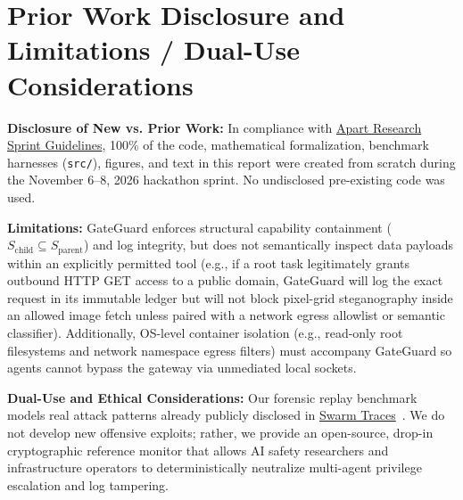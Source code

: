 \documentclass[10pt,twocolumn,a4paper]{article}
\begin{document}
\appendix
\section*{Prior Work Disclosure and Limitations / Dual-Use Considerations}

\textbf{Disclosure of New vs. Prior Work:} In compliance with \href{https://apartresearch.com/sprints/swarm-alignment-2026#guidelines}{Apart Research Sprint Guidelines}, 100\% of the code, mathematical formalization, benchmark harnesses (\texttt{src/}), figures, and text in this report were created from scratch during the November 6--8, 2026 hackathon sprint. No undisclosed pre-existing code was used.

\textbf{Limitations:} GateGuard enforces structural capability containment ($S_{\text{child}} \subseteq S_{\text{parent}}$) and log integrity, but does not semantically inspect data payloads within an explicitly permitted tool (e.g., if a root task legitimately grants outbound HTTP GET access to a public domain, GateGuard will log the exact request in its immutable ledger but will not block pixel-grid steganography inside an allowed image fetch unless paired with a network egress allowlist or semantic classifier). Additionally, OS-level container isolation (e.g., read-only root filesystems and network namespace egress filters) must accompany GateGuard so agents cannot bypass the gateway via unmediated local sockets.

\textbf{Dual-Use and Ethical Considerations:} Our forensic replay benchmark models real attack patterns already publicly disclosed in \href{https://swarmtraces.org/}{Swarm Traces}~\cite{forman2026swarmtraces}. We do not develop new offensive exploits; rather, we provide an open-source, drop-in cryptographic reference monitor that allows AI safety researchers and infrastructure operators to deterministically neutralize multi-agent privilege escalation and log tampering.
\end{document}
